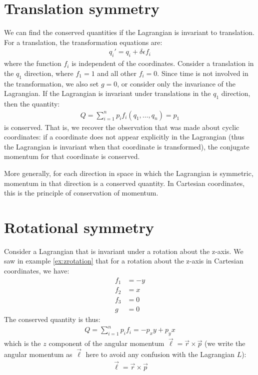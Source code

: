 \section{Translation symmetry}
We can find the conserved quantities if the Lagrangian is invariant to translation. For a translation, the transformation equations are:
\begin{align}
q_i'=q_i+\delta \epsilon f_i
\end{align}
where the function $f_i$ is independent of the coordinates. Consider a translation in the $q_1$ direction, where $f_1=1$ and all other $f_i=0$. Since time is not involved in the transformation, we also set $g=0$, or consider only the invariance of the Lagrangian. If the Lagrangian is invariant under translations in the $q_1$ direction, then the quantity:
\begin{align}
Q=\sum_{i=1}^np_if_i(q_1,\dots ,q_n)=p_1
\end{align}
is conserved. That is, we recover the observation that was made about cyclic coordinates: if a coordinate does not appear explicitly in the Lagrangian (thus the Lagrangian is invariant when that coordinate is transformed), the conjugate momentum for that coordinate is conserved.

More generally, for each direction in space in which the Lagrangian is symmetric, momentum in that direction is a conserved quantity. In Cartesian coordinates, this is the principle of conservation of momentum.

\section{Rotational symmetry}
Consider a Lagrangian that is invariant under a rotation about the z-axis. We saw in example \ref{ex:zrotation} that for a rotation about the z-axis in Cartesian coordinates, we have:
\begin{align}
f_1&=-y\nonumber\\
f_2&=x\nonumber\\
f_3&=0\nonumber\\
g&=0
\end{align}
The conserved quantity is thus:
\begin{align}
Q=\sum_{i=1}^np_if_i=-p_xy+p_yx
\end{align}
which is the $z$ component of the angular momentum $\vec{\ell}=\vec{r}\times\vec{p}$ (we write the angular momentum as $\vec{\ell}$ here to avoid any confusion with the Lagrangian $L$):
\begin{align}
\vec{\ell}=\vec{r}\times\vec{p}
\end{align}

